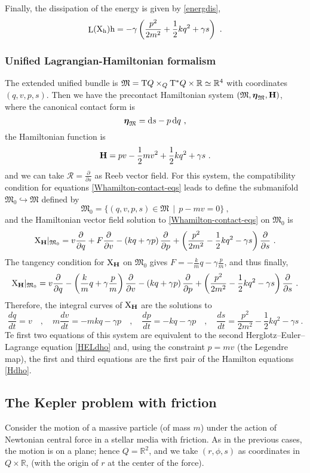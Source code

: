 \documentclass[12pt]{report}
\def\dst{\displaystyle}
\def\derpar#1#2{\frac{\partial{#1}}{\partial{#2}}}
\def\d{{\rm d}}
\def\Real{\mathbb{R}}
\def\bmeta{\mbox{\boldmath $\eta$}}
\def\X{{\rm X}}
\def\Tan{{\rm T}}
\def\Lie{\mathop{\rm L}\nolimits}
\newcommand{\Reeb}{\mathcal{R}}
\begin{document}
Finally, the dissipation of the energy is given by \eqref{energdis},
$$
\Lie(\X_{\rm h}){\rm h}=-\gamma\left(\frac{p^2}{2m^2} + \frac{1}{2}kq^2 + \gamma s\right)\ .
$$


\subsubsection{Unified Lagrangian-Hamiltonian formalism}


The extended unified bundle is $\mathfrak{M}=\Tan Q\times_Q\Tan^*Q\times\Real\simeq\Real^4$
with coordinates $(q,v,p,s)$.
Then we have the precontact Hamiltonian system
$(\mathfrak{M},\bmeta_{\mathfrak{M}},{\bf H})$,
where the canonical contact form is
$$
\bmeta_{\mathfrak{M}}=\d s-p\,\d q \ ,
$$
the Hamiltonian function is
$$
{\bf H}=pv-\frac{1}{2}mv^{2}+\frac{1}{2}kq^{2}+\gamma s \ .
$$
and we can take $\dst \Reeb=\derpar{}{s}$ as Reeb vector field.
For this system, the compatibility condition for equations \eqref{Whamilton-contact-eqs} leads to define the submanifold $\mathfrak{M}_0\hookrightarrow\mathfrak{M}$
defined by
$$
\mathfrak{M}_0=\{ (q,v,p,s)\in\mathfrak{M}\,\mid\,  p-mv=0 \} \ ,
$$
and the Hamiltonian vector field solution to \eqref{Whamilton-contact-eqs} on $\mathfrak{M}_0$ is
$$
\X_{\bf H}\vert_{\mathfrak{M}_0}=
v\derpar{}{q}+F\derpar{}{v}-
\left(kq+\gamma p\right)\derpar{}{p}
+\left(\frac{p^2}{2m^2}-\frac{1}{2}kq^2-\gamma s\right)\derpar{}{s}\ .
$$
The tangency condition for $\X_{\bf H}$ on $\mathfrak{M}_0$ gives
$\dst F=-\frac{k}{m}q-\gamma\frac{p}{m}$,
and thus finally,
$$
\X_{\bf H}\vert_{\mathfrak{M}_0}=
v\derpar{}{q}-\left(\frac{k}{m}q+\gamma\frac{p}{m}\right)\derpar{}{v}-
\left(kq+\gamma p\right)\derpar{}{p}
+\left(\frac{p^2}{2m^2}-\frac{1}{2}kq^2-\gamma s\right)\derpar{}{s}\ .
$$
Therefore, the integral curves of $\X_{\bf H}$ are the solutions to
$$
\frac{dq}{dt}=v \quad , \quad
m\frac{dv}{dt}=-mkq-\gamma p \quad , \quad
\frac{dp}{dt}=-kq-\gamma p \quad , 
\quad
\frac{ds}{dt}=\frac{p^2}{2m^2}-\frac{1}{2}kq^2-\gamma s \ .
$$
Te first two equations of this system are equivalent to the
second Herglotz--Euler--Lagrange equation
\eqref{HELdho}
and, using the constraint $p=mv$ (the Legendre map),
the first and third equations are the first pair of the Hamilton equations \eqref{Hdho}.


\subsection{The Kepler problem with friction}


Consider the motion of a massive particle (of mass $m$)
under the action of Newtonian central force
in a stellar media with friction.
As in the previous cases, the motion is on a plane; hence
$Q=\Real^2$, and we take $(r,\phi,s)$ as coordinates in $Q\times\Real$,
(with the origin of $r$ at the center of the force).
\end{document}
